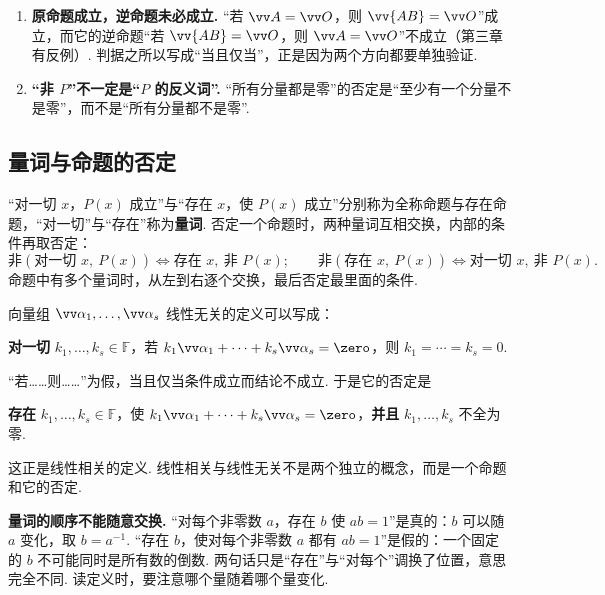 \begin{pitfallbox}
	\begin{enumerate}
		\item \textbf{原命题成立，逆命题未必成立.} “若 $\vv A=\vv O$，则 $\vv{AB}=\vv O$”成立，而它的逆命题“若 $\vv{AB}=\vv O$，则 $\vv A=\vv O$”不成立（第三章有反例）. 判据之所以写成“当且仅当”，正是因为两个方向都要单独验证.
		\item \textbf{“非 $P$”不一定是“$P$ 的反义词”.} “所有分量都是零”的否定是“至少有一个分量不是零”，而不是“所有分量都不是零”.
	\end{enumerate}
\end{pitfallbox}

\subsection{量词与命题的否定}

“对一切 $x$，$P(x)$ 成立”与“存在 $x$，使 $P(x)$ 成立”分别称为全称命题与存在命题，“对一切”与“存在”称为\textbf{量词}. 否定一个命题时，两种量词互相交换，内部的条件再取否定：
\[
\text{非}(\text{对一切 }x,\ P(x))\iff\text{存在 }x,\ \text{非 }P(x);\qquad
\text{非}(\text{存在 }x,\ P(x))\iff\text{对一切 }x,\ \text{非 }P(x).
\]
命题中有多个量词时，从左到右逐个交换，最后否定最里面的条件.

\begin{example}
	向量组 $\vv\alpha_1,\ldots,\vv\alpha_s$ 线性无关的定义可以写成：
	\begin{center}
		\textbf{对一切} $k_1,\ldots,k_s\in\mathbb{F}$，若 $k_1\vv\alpha_1+\cdots+k_s\vv\alpha_s=\zero$，则 $k_1=\cdots=k_s=0$.
	\end{center}
	“若……则……”为假，当且仅当条件成立而结论不成立. 于是它的否定是
	\begin{center}
		\textbf{存在} $k_1,\ldots,k_s\in\mathbb{F}$，使 $k_1\vv\alpha_1+\cdots+k_s\vv\alpha_s=\zero$，\textbf{并且} $k_1,\ldots,k_s$ 不全为零.
	\end{center}
	这正是线性相关的定义. 线性相关与线性无关不是两个独立的概念，而是一个命题和它的否定.
\end{example}

\begin{pitfallbox}
	\textbf{量词的顺序不能随意交换.} “对每个非零数 $a$，存在 $b$ 使 $ab=1$”是真的：$b$ 可以随 $a$ 变化，取 $b=a^{-1}$. “存在 $b$，使对每个非零数 $a$ 都有 $ab=1$”是假的：一个固定的 $b$ 不可能同时是所有数的倒数. 两句话只是“存在”与“对每个”调换了位置，意思完全不同. 读定义时，要注意哪个量随着哪个量变化.
\end{pitfallbox}

